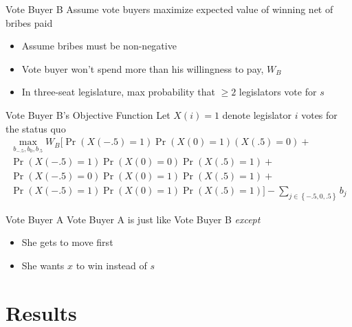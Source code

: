 \documentclass[handout]{beamer}
\begin{document}
\begin{frame}{Vote Buyer B}
\pause
Assume vote buyers maximize expected value of winning net of bribes paid  
\begin{itemize}[<+->]
	\item Assume bribes must be non-negative
	\item Vote buyer won't spend more than his willingness to pay, $W_B$
	\item In three-seat legislature, max probability that $\geq 2$ legislators vote for $s$
\end{itemize}
\end{frame}

\begin{frame}{Vote Buyer B's Objective Function}
\pause
Let $X(i) = 1$ denote legislator $i$ votes for the status quo
\begin{multline*}
			    \max_{b_{-.5}, b_0, b_{.5}} 
					W_B \biggl[ \Pr\left(X\left(-.5\right)=1\right)\Pr\left(X\left(0\right)=1\right)\left(X\left(.5\right)=0\right)  + \\
					\Pr\left(X\left(-.5\right)=1\right)\Pr\left(X\left(0\right)=0\right)\Pr\left(X\left(.5\right)=1\right) + \\
					\Pr\left(X\left(-.5\right)=0\right)\Pr\left(X\left(0\right)=1\right)\Pr\left(X\left(.5\right)=1\right) + \\
					\Pr\left(X\left(-.5\right)=1\right)\Pr\left(X\left(0\right)=1\right)\Pr\left(X\left(.5\right)=1\right) \biggr] - \sum_{j\in \left\{-.5, 0,.5\right\}} b_j
				\end{multline*}
\end{frame}


\begin{frame}{Vote Buyer A}
\pause
Vote Buyer A is just like Vote Buyer B \textit{except}
\begin{itemize}[<+->]
	\item She gets to move first
	\item She wants $x$ to win instead of $s$
\end{itemize}
\end{frame}





\section{Results}
\end{document}
